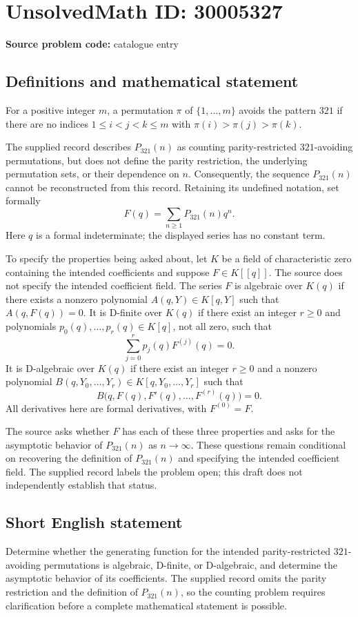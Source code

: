 \documentclass[11pt]{article}
\begin{document}
\section*{UnsolvedMath ID: 30005327}
\textbf{Source problem code:} catalogue entry
\subsection{Definitions and mathematical statement}
For a positive integer \(m\), a permutation \(\pi\) of \(\{1,\ldots,m\}\) avoids the pattern \(321\) if there are no indices \(1\leq i<j<k\leq m\) with \(\pi(i)>\pi(j)>\pi(k)\).

The supplied record describes \(P_{321}(n)\) as counting parity-restricted \(321\)-avoiding permutations, but does not define the parity restriction, the underlying permutation sets, or their dependence on \(n\). Consequently, the sequence \(P_{321}(n)\) cannot be reconstructed from this record. Retaining its undefined notation, set formally
\[
F(q)=\sum_{n\geq 1}P_{321}(n)q^n.
\]
Here \(q\) is a formal indeterminate; the displayed series has no constant term.

To specify the properties being asked about, let \(K\) be a field of characteristic zero containing the intended coefficients and suppose \(F\in K[[q]]\). The source does not specify the intended coefficient field. The series \(F\) is algebraic over \(K(q)\) if there exists a nonzero polynomial \(A(q,Y)\in K[q,Y]\) such that \(A(q,F(q))=0\). It is D-finite over \(K(q)\) if there exist an integer \(r\geq 0\) and polynomials \(p_0(q),\ldots,p_r(q)\in K[q]\), not all zero, such that
\[
\sum_{j=0}^{r}p_j(q)F^{(j)}(q)=0.
\]
It is D-algebraic over \(K(q)\) if there exist an integer \(r\geq 0\) and a nonzero polynomial \(B(q,Y_0,\ldots,Y_r)\in K[q,Y_0,\ldots,Y_r]\) such that
\[
B\bigl(q,F(q),F'(q),\ldots,F^{(r)}(q)\bigr)=0.
\]
All derivatives here are formal derivatives, with \(F^{(0)}=F\).

The source asks whether \(F\) has each of these three properties and asks for the asymptotic behavior of \(P_{321}(n)\) as \(n\to\infty\). These questions remain conditional on recovering the definition of \(P_{321}(n)\) and specifying the intended coefficient field. The supplied record labels the problem open; this draft does not independently establish that status.
\subsection{Short English statement}
Determine whether the generating function for the intended parity-restricted \(321\)-avoiding permutations is algebraic, D-finite, or D-algebraic, and determine the asymptotic behavior of its coefficients. The supplied record omits the parity restriction and the definition of \(P_{321}(n)\), so the counting problem requires clarification before a complete mathematical statement is possible.
\end{document}
